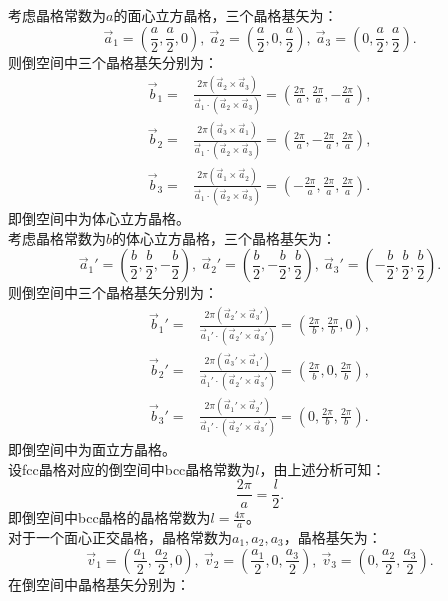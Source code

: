 \documentclass[reqno,a4paper,12pt]{amsart}
\begin{document}
\begin{tcolorbox}[breakable, colback = black!5!white, colframe = black]
考虑晶格常数为$a$的面心立方晶格，三个晶格基矢为：
\[
	\vec{a}_1 = \left( \frac{a}{2}, \frac{a}{2}, 0 \right), ~ \vec{a}_2 = \left( \frac{a}{2}, 0, \frac{a}{2} \right), ~ \vec{a}_3 = \left( 0, \frac{a}{2}, \frac{a}{2} \right).
\]
则倒空间中三个晶格基矢分别为：
\begin{align*}
	\vec{b}_1 =& \frac{2\pi (\vec{a}_2 \times \vec{a}_3)}{\vec{a}_1\cdot (\vec{a}_2\times\vec{a}_3)} = \left( \frac{2\pi}{a}, \frac{2\pi}{a}, -\frac{2\pi}{a} \right), \\
	\vec{b}_2 =& \frac{2\pi (\vec{a}_3 \times \vec{a}_1)}{\vec{a}_1\cdot (\vec{a}_2\times\vec{a}_3)} = \left( \frac{2\pi}{a}, -\frac{2\pi}{a}, \frac{2\pi}{a} \right), \\
	\vec{b}_3 =& \frac{2\pi (\vec{a}_1 \times \vec{a}_2)}{\vec{a}_1\cdot (\vec{a}_2\times\vec{a}_3)} = \left( -\frac{2\pi}{a}, \frac{2\pi}{a}, \frac{2\pi}{a} \right). 
\end{align*}
即倒空间中为体心立方晶格。 \\
考虑晶格常数为$b$的体心立方晶格，三个晶格基矢为：
\[
	\vec{a}_1' = \left( \frac{b}{2}, \frac{b}{2}, -\frac{b}{2} \right), ~ \vec{a}_2' = \left( \frac{b}{2}, -\frac{b}{2}, \frac{b}{2} \right), ~ \vec{a}_3' = \left( -\frac{b}{2}, \frac{b}{2}, \frac{b}{2} \right).
\]
则倒空间中三个晶格基矢分别为：
\begin{align*}
	\vec{b}_1' =& \frac{2\pi (\vec{a}_2' \times \vec{a}_3')}{\vec{a}_1'\cdot (\vec{a}_2'\times\vec{a}_3')} = \left( \frac{2\pi}{b}, \frac{2\pi}{b}, 0 \right), \\
	\vec{b}_2' =& \frac{2\pi (\vec{a}_3' \times \vec{a}_1')}{\vec{a}_1'\cdot (\vec{a}_2'\times\vec{a}_3')} = \left( \frac{2\pi}{b}, 0, \frac{2\pi}{b} \right), \\
	\vec{b}_3' =& \frac{2\pi (\vec{a}_1' \times \vec{a}_2')}{\vec{a}_1'\cdot (\vec{a}_2'\times\vec{a}_3')} = \left( 0, \frac{2\pi}{b}, \frac{2\pi}{b} \right). 
\end{align*}
即倒空间中为面立方晶格。 \\
设fcc晶格对应的倒空间中bcc晶格常数为$l$，由上述分析可知：
\[
	\frac{2\pi}{a} = \frac{l}{2}.
\]
即倒空间中bcc晶格的晶格常数为$l = \frac{4\pi}{a}$。 \\
对于一个面心正交晶格，晶格常数为$a_1, a_2, a_3$，晶格基矢为：
\[
	\vec{v}_1 = \left( \frac{a_1}{2}, \frac{a_2}{2}, 0 \right), ~ \vec{v}_2 = \left( \frac{a_1}{2}, 0, \frac{a_3}{2} \right), ~ \vec{v}_3 = \left( 0, \frac{a_2}{2}, \frac{a_3}{2} \right).
\]
在倒空间中晶格基矢分别为：

\end{tcolorbox}
\end{document}
